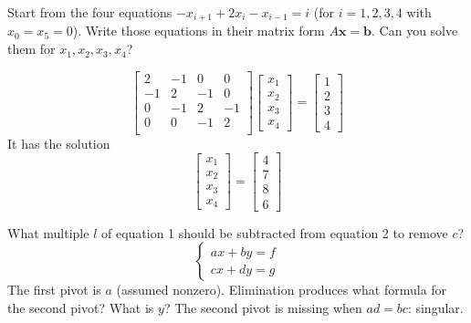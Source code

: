 \documentclass[answers]{worksheet}
\begin{document}
\makeworksheettitle

\begin{question}
    Start from the four equations $-x_{i+1}+2x_i-x_{i-1}=i$ (for $i=1,2,3,4$ with $x_0=x_5=0$). Write those equations in their matrix form $A\boldsymbol{x}=\boldsymbol{b}$. Can you solve them for $x_1,x_2,x_3,x_4$?
    
    \blankspace{15em}
\end{question}

\begin{answer}
    \begin{equation}
        \begin{bmatrix}
            2 & -1 & 0 & 0 \\
            -1 & 2 & -1 & 0 \\
            0 & -1 & 2 & -1 \\
            0 & 0 & -1 & 2 \\
        \end{bmatrix}
        \begin{bmatrix}
            x_1 \\ x_2 \\ x_3 \\ x_4
        \end{bmatrix}
        =
        \begin{bmatrix}
            1 \\ 2 \\ 3 \\ 4
        \end{bmatrix}
    \end{equation}
    It has the solution
    \begin{equation}
        \begin{bmatrix}
            x_1 \\ x_2 \\ x_3 \\ x_4
        \end{bmatrix}
        =
        \begin{bmatrix}
            4 \\ 7 \\ 8 \\ 6
        \end{bmatrix}
    \end{equation}
\end{answer}

\begin{question}
    What multiple $l$ of equation 1 should be subtracted from equation 2 to remove $c$?
    \begin{equation}
        \begin{cases}
            ax+by=f \\ cx+dy=g
        \end{cases}
    \end{equation}
    The first pivot is $a$ (assumed nonzero). Elimination produces what formula for the second pivot? What is $y$? The second pivot is 
    missing when $ad=bc$: singular.
    
    \blankspace{15em}
\end{question}
\end{document}
